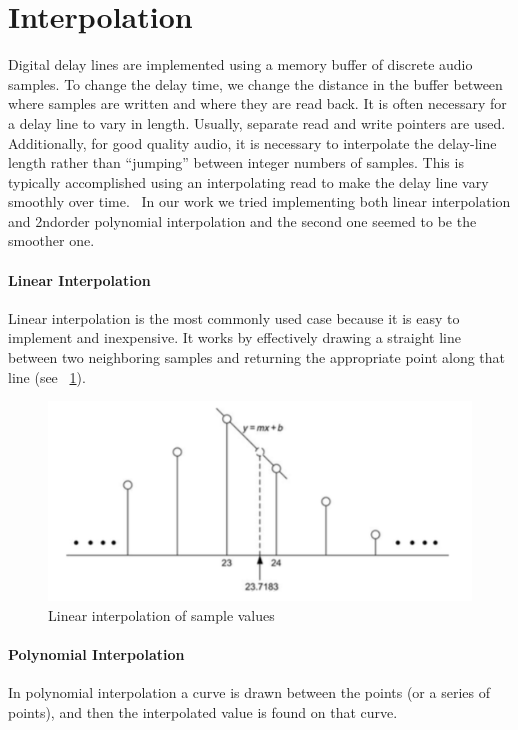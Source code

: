 \section{Interpolation}

Digital delay lines are implemented using a memory buffer of discrete audio samples. To change the delay time, we change the distance in the buffer between where samples are written and where they are read back.\cite{reiss2014audio}
It is often necessary for a delay line to vary in length. Usually, separate read and write pointers are used. Additionally, for good quality audio, it is necessary to interpolate the delay-line length rather than ``jumping'' between integer numbers of samples. This is typically accomplished using an interpolating read to make the delay line vary smoothly over time.~\cite{smith2010physical}
In our work we tried implementing both linear interpolation and 2ndorder polynomial interpolation and the second one seemed to be the smoother one.

\paragraph{Linear Interpolation}
Linear interpolation is the most commonly used case because it is easy to implement and inexpensive.
It works by effectively drawing a straight line between two neighboring samples and returning the appropriate point along that line (see ~\ref{fig:linear-interpolation}).
  
\begin{figure}[h]
	\centering
  	\includegraphics[width=0.8\linewidth]{assets/Linear interpolation of sample values.png}
  	\caption{Linear interpolation of sample values}
  	\label{fig:linear-interpolation}
\end{figure}



\paragraph{Polynomial Interpolation}
In polynomial interpolation a curve is drawn between the points (or a series of points), and then the interpolated value is found on that curve.~\cite{pirkle2013designing}



